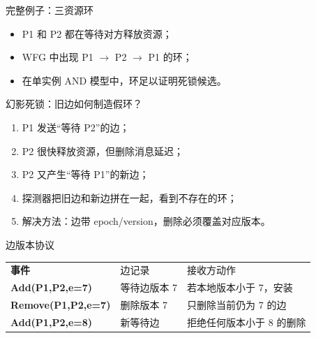 \documentclass[UTF8,fontset=none,aspectratio=169,10pt]{beamer}
\begin{document}
\begin{frame}{完整例子：三资源环}
\begin{center}
\end{center}
\begin{itemize}
  \item P1 和 P2 都在等待对方释放资源；
  \item WFG 中出现 P1 $\rightarrow$ P2 $\rightarrow$ P1 的环；
  \item 在单实例 AND 模型中，环足以证明死锁候选。
\end{itemize}
\end{frame}

\begin{frame}{幻影死锁：旧边如何制造假环？}
\begin{enumerate}
  \item P1 发送“等待 P2”的边；
  \item P2 很快释放资源，但删除消息延迟；
  \item P2 又产生“等待 P1”的新边；
  \item 探测器把旧边和新边拼在一起，看到不存在的环；
  \item 解决方法：边带 epoch/version，删除必须覆盖对应版本。
\end{enumerate}
\end{frame}

\begin{frame}{边版本协议}
\scriptsize
\begin{tabularx}{\linewidth}{>{\bfseries}p{3cm}XX}
\toprule
事件 & 边记录 & 接收方动作 \\
Add(P1,P2,e=7) & 等待边版本 7 & 若本地版本小于 7，安装 \\
Remove(P1,P2,e=7) & 删除版本 7 & 只删除当前仍为 7 的边 \\
Add(P1,P2,e=8) & 新等待边 & 拒绝任何版本小于 8 的删除 \\
\bottomrule
\end{tabularx}
\normalsize
\vfill
\end{frame}
\end{document}
